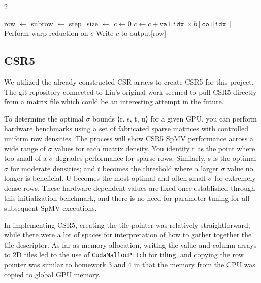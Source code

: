 \documentclass{article}
\begin{document}
\begin{multicols}{2}
\begin{algorithm}[H]
\caption{Vector CSR kernel}
\label{alg:ginkgo-csr}
\begin{algorithmic}[1]
\State row $\gets$ 
\State subrow $\gets$ 
\State step\_size $\gets$ 
\State $c \gets 0$
    \State $c \gets c + \texttt{val[idx]} \times b[\texttt{col[idx]}]$
    \EndFor
    \State Perform warp reduction on $c$
        \State Write $c$ to output[row]
    \EndIf
\EndFor
\end{algorithmic}
\end{algorithm}
\subsection{CSR5}

We utilized the already constructed CSR arrays to create CSR5 for this project. The git repository connected to Liu's original work \cite{Liu2015CSR5} seemed to pull CSR5 directly from a matrix file which could be an interesting attempt in the future.

To determine the optimal $\sigma$ bounds ⟨r, s, t, u⟩ for a given GPU, you can perform hardware benchmarks using a set of fabricated sparse matrices with controlled uniform row densities. The process will show CSR5 SpMV performance across a wide range of $\sigma$ values for each matrix density. You identify r as the point where too-small of a $\sigma$ degrades performance for sparse rows. Similarly, s is the optimal $\sigma$ for moderate densities; and $t$ becomes the threshold where a larger $\sigma$ value no longer is beneficial. U becomes the most optimal and often small $\sigma$ for extremely dense rows. These hardware-dependent values are fixed once established through this initialization benchmark, and there is no need for parameter tuning for all subsequent SpMV executions. 

In implementing CSR5, creating the tile pointer was relatively straightforward, while there were a lot of spaces for interpretation of how to gather together the tile descriptor. As far as memory allocation, writing the value and column arrays to 2D tiles led to the use of \texttt{CudaMallocPitch} for tiling, and copying the row pointer was similar to homework 3 and 4 in that the memory from the CPU was copied to global GPU memory. 


\end{multicols}
\end{document}
